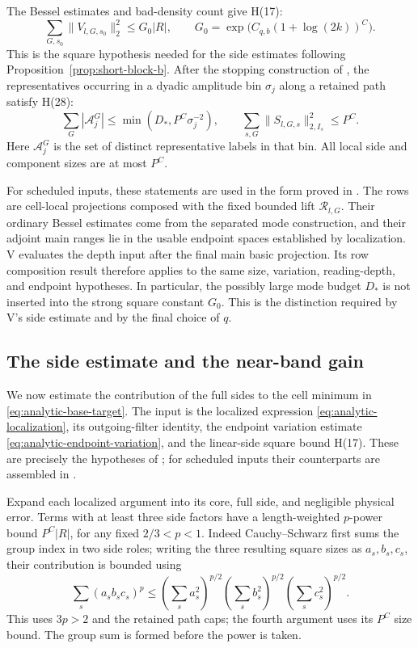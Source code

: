 The Bessel estimates and bad-density count give H(17):
\[
 \sum_{G,s_0}\|V_{l,G,s_0}\|_2^2\le G_0|R|,
 \qquad G_0=\exp\bigl(C_{q,b}(1+\log(2k))^C\bigr).
\]
This is the square hypothesis needed for the side estimates following
Proposition~\ref{prop:short-block-b}.  After the stopping construction
of \cite[Proposition~8.12]{H}, the representatives occurring in a
dyadic amplitude bin \(\sigma_j\) along a retained path satisfy H(28):
\begin{equation}\label{eq:core-path-budgets-b}
 \sum_G|\mathcal A_j^G|
       \le\min(D_*,P^C\sigma_j^{-2}),\qquad
 \sum_{s,G}\|S_{l,G,s}\|_{2,I_s}^2\le P^C.
\end{equation}
Here \(\mathcal A_j^G\) is the set of distinct representative labels
in that bin.  All local
side and component sizes are at most \(P^C\).

For scheduled inputs, these statements are used in the form proved
in \cite[Section~6.3--6.4, especially Lemma~6.3]{V}.  The rows are
cell-local projections composed with the fixed bounded lift
\(\mathcal R_{l,G}\).  Their ordinary Bessel estimates come from
the separated mode construction, and their adjoint main ranges lie
in the usable endpoint spaces established by localization.  V evaluates
the depth input after the final main basic projection.  Its row
composition result therefore applies to the same size, variation,
reading-depth, and endpoint hypotheses.  In particular, the possibly
large mode budget \(D_*\) is not inserted into the strong square
constant \(G_0\).  This is the distinction required by V's side
estimate and by the final choice of \(q\).

\subsection{The side estimate and the near-band gain}

We now estimate the contribution of the full sides to the cell minimum
in \eqref{eq:analytic-base-target}.  The input is the localized expression
\eqref{eq:analytic-localization}, its outgoing-filter identity, the
endpoint variation estimate \eqref{eq:analytic-endpoint-variation},
and the linear-side square bound H(17).  These are precisely the
hypotheses of \cite[Proposition~7.5]{H}; for scheduled inputs their
counterparts are assembled in \cite[Section~6.5]{V}.

Expand each localized argument into its core, full side, and negligible
physical error.  Terms with at least three side factors have a
length-weighted \(p\)-power bound \(P^C|R|\), for any fixed
\(2/3<p<1\).  Indeed Cauchy--Schwarz first sums the group index in
two side roles; writing the three resulting square sizes as
\(a_s,b_s,c_s\), their contribution is bounded using
\[
 \sum_s(a_sb_sc_s)^p
 \le
   \left(\sum_s a_s^2\right)^{p/2}
   \left(\sum_s b_s^2\right)^{p/2}
   \left(\sum_s c_s^2\right)^{p/2}.
\]
This uses \(3p>2\) and the retained path caps; the fourth argument
uses its \(P^C\) size bound.  The group sum is formed before the
power is taken.


